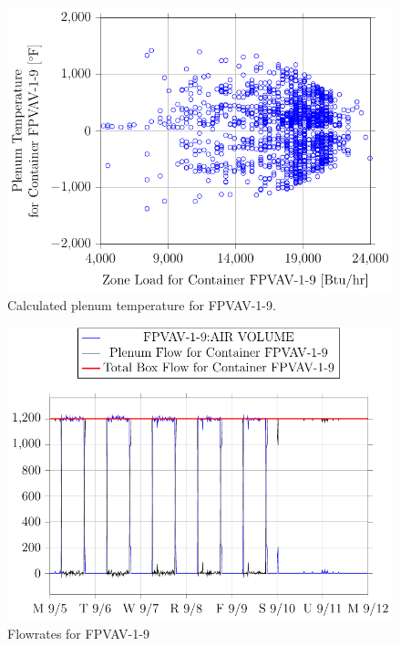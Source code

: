 \begin{figure}
\centering
\includegraphics[]{Plots/2016-09-16-1006-PlenumTemperatureforContainerFPVAV19vsZoneLoadforContainerFPVAV19.pdf}
\caption{Calculated plenum temperature for FPVAV-1-9.}
\label{fig:2016-09-16-1006-PlenumTemperatureforContainerFPVAV19vsZoneLoadforContainerFPVAV19}
\end{figure}

\begin{figure}
\centering
\includegraphics[]{Plots/2016-09-16-1639-FPVAV19AIRVOLUME-TikzData.pdf}
\caption{Flowrates for FPVAV-1-9}
\label{fig:2016-09-16-1639-FPVAV19AIRVOLUME-TikzData}
\end{figure}

